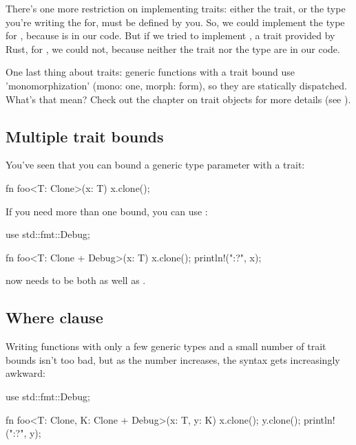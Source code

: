 \blank

There's one more restriction on implementing traits: either the trait, or the type you're writing the  for, must be defined 
by you. So, we could implement the  type for \itt, because  is in our code. But if we tried to implement 
, a trait provided by Rust, for \itt, we could not, because neither the trait nor the type are in our code.

\blank

One last thing about traits: generic functions with a trait bound use 'monomorphization' (mono: one, morph: form), so they are 
statically dispatched. What's that mean? Check out the chapter on trait objects for more details (see ).

\subsection*{Multiple trait bounds}

You've seen that you can bound a generic type parameter with a trait:

\begin{rustc}
fn foo<T: Clone>(x: T) {
    x.clone();
}
\end{rustc}

If you need more than one bound, you can use \code{+}:

\begin{rustc}
use std::fmt::Debug;

fn foo<T: Clone + Debug>(x: T) {
    x.clone();
    println!("{:?}", x);
}
\end{rustc}

 now needs to be both  as well as .

\subsection*{Where clause}

Writing functions with only a few generic types and a small number of trait bounds isn't too bad, but as the number increases, the 
syntax gets increasingly awkward:

\begin{rustc}
use std::fmt::Debug;

fn foo<T: Clone, K: Clone + Debug>(x: T, y: K) {
    x.clone();
    y.clone();
    println!("{:?}", y);
}
\end{rustc}

